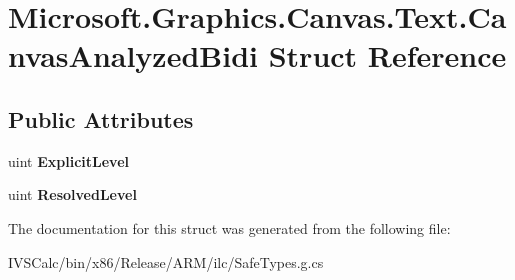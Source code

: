 \hypertarget{struct_microsoft_1_1_graphics_1_1_canvas_1_1_text_1_1_canvas_analyzed_bidi}{}\section{Microsoft.\+Graphics.\+Canvas.\+Text.\+Canvas\+Analyzed\+Bidi Struct Reference}
\label{struct_microsoft_1_1_graphics_1_1_canvas_1_1_text_1_1_canvas_analyzed_bidi}
\subsection*{Public Attributes}
\begin{DoxyCompactItemize}
\item 
\mbox{\label{struct_microsoft_1_1_graphics_1_1_canvas_1_1_text_1_1_canvas_analyzed_bidi_aebf35bbaf3dbe5bb1ca8fc9a438113bf}} 
uint {\bfseries Explicit\+Level}
\item 
\mbox{\label{struct_microsoft_1_1_graphics_1_1_canvas_1_1_text_1_1_canvas_analyzed_bidi_a6bf66924ab25a0613b92cd93635405e8}} 
uint {\bfseries Resolved\+Level}
\end{DoxyCompactItemize}


The documentation for this struct was generated from the following file\+:\begin{DoxyCompactItemize}
\item 
I\+V\+S\+Calc/bin/x86/\+Release/\+A\+R\+M/ilc/Safe\+Types.\+g.\+cs\end{DoxyCompactItemize}
